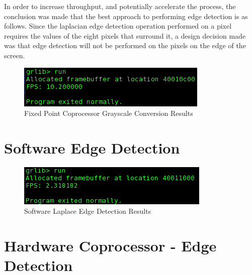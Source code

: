 \documentclass{article}
\begin{document}
In order to increase throughput, and potentially accelerate the process, the conclusion was made that the best approach to performing edge detection is as follows. Since the laplacian edge detection operation performed on a pixel requires the values of the eight pixels that surround it, a design decision made was that edge detection will not be performed on the pixels on the edge of the screen. 

	 \begin{figure}[H]
	 	\begin{center}
	 		\includegraphics[scale=0.6]{../part5_files/Fixed_point_greyscale_coprocessor_results.png}
	 		\caption{Fixed Point Coprocessor Grayscale Conversion Results}
	 	\end{center}
	 \end{figure}


\section{Software Edge Detection}

	 \begin{figure}[H]
	 	\begin{center}
	 		\includegraphics[scale=0.6]{../part6_files/Software_Laplace_edge_software_performance.png}
	 		\caption{Software Laplace Edge Detection Results}
	 	\end{center}
	 \end{figure}


\section{Hardware Coprocessor - Edge Detection}
\end{document}
